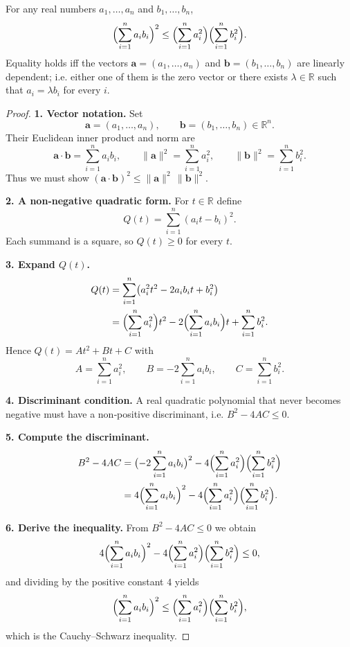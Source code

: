 \begin{theorem}
For any real numbers $a_{1},\dots ,a_{n}$ and $b_{1},\dots ,b_{n}$,
\[
\Bigl(\sum_{i=1}^{n} a_{i}b_{i}\Bigr)^{2}
\le
\Bigl(\sum_{i=1}^{n} a_{i}^{2}\Bigr)\Bigl(\sum_{i=1}^{n} b_{i}^{2}\Bigr).
\]
Equality holds iff the vectors 
$\mathbf a=(a_{1},\dots ,a_{n})$ and $\mathbf b=(b_{1},\dots ,b_{n})$ are
linearly dependent; i.e. either one of them is the zero vector or there exists
$\lambda\in\mathbb R$ such that $a_{i}=\lambda b_{i}$ for every $i$.
\end{theorem}

\begin{proof}
\textbf{1. Vector notation.}  
Set 
\[
\mathbf a=(a_{1},\dots ,a_{n}),\qquad 
\mathbf b=(b_{1},\dots ,b_{n})\in\mathbb R^{n}.
\]
Their Euclidean inner product and norm are
\[
\mathbf a\cdot\mathbf b=\sum_{i=1}^{n}a_{i}b_{i},\qquad
\|\mathbf a\|^{2}= \sum_{i=1}^{n}a_{i}^{2},\qquad
\|\mathbf b\|^{2}= \sum_{i=1}^{n}b_{i}^{2}.
\]
Thus we must show $(\mathbf a\cdot\mathbf b)^{2}\le\|\mathbf a\|^{2}\,\|\mathbf b\|^{2}$.

\textbf{2. A non‑negative quadratic form.}  
For $t\in\mathbb R$ define
\[
Q(t)=\sum_{i=1}^{n}(a_{i}t-b_{i})^{2}.
\]
Each summand is a square, so $Q(t)\ge 0$ for every $t$.

\textbf{3. Expand $Q(t)$.}
\begin{align*}
Q(t)&=\sum_{i=1}^{n}\bigl(a_{i}^{2}t^{2}-2a_{i}b_{i}t+b_{i}^{2}\bigr)\\
&=\Bigl(\sum_{i=1}^{n}a_{i}^{2}\Bigr)t^{2}
   -2\Bigl(\sum_{i=1}^{n}a_{i}b_{i}\Bigr)t
   +\sum_{i=1}^{n}b_{i}^{2}.
\end{align*}
Hence $Q(t)=At^{2}+Bt+C$ with  
\[
A=\sum_{i=1}^{n}a_{i}^{2},\qquad 
B=-2\sum_{i=1}^{n}a_{i}b_{i},\qquad 
C=\sum_{i=1}^{n}b_{i}^{2}.
\]

\textbf{4. Discriminant condition.}  
A real quadratic polynomial that never becomes negative must have a
non‑positive discriminant, i.e. $B^{2}-4AC\le 0$.

\textbf{5. Compute the discriminant.}
\begin{align*}
B^{2}-4AC
&=\bigl(-2\sum_{i=1}^{n}a_{i}b_{i}\bigr)^{2}
   -4\Bigl(\sum_{i=1}^{n}a_{i}^{2}\Bigr)\Bigl(\sum_{i=1}^{n}b_{i}^{2}\Bigr)\\
&=4\Bigl(\sum_{i=1}^{n}a_{i}b_{i}\Bigr)^{2}
   -4\Bigl(\sum_{i=1}^{n}a_{i}^{2}\Bigr)\Bigl(\sum_{i=1}^{n}b_{i}^{2}\Bigr).
\end{align*}

\textbf{6. Derive the inequality.}  
From $B^{2}-4AC\le 0$ we obtain
\[
4\Bigl(\sum_{i=1}^{n}a_{i}b_{i}\Bigr)^{2}
   -4\Bigl(\sum_{i=1}^{n}a_{i}^{2}\Bigr)\Bigl(\sum_{i=1}^{n}b_{i}^{2}\Bigr)\le 0,
\]
and dividing by the positive constant $4$ yields
\[
\Bigl(\sum_{i=1}^{n} a_{i}b_{i}\Bigr)^{2}
\le
\Bigl(\sum_{i=1}^{n} a_{i}^{2}\Bigr)\Bigl(\sum_{i=1}^{n} b_{i}^{2}\Bigr),
\]
which is the Cauchy–Schwarz inequality.


\end{proof}
